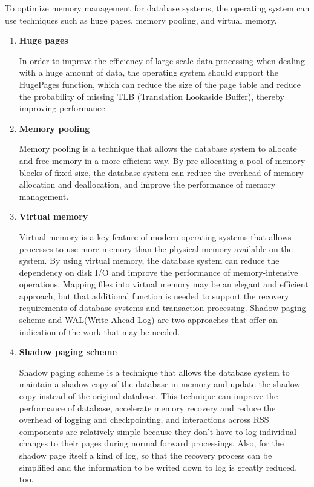\documentclass[11pt,a4paper]{article}
\begin{document}
To optimize memory management for database systems, the operating system can use techniques such as huge pages, memory pooling, and virtual memory.
\begin{enumerate}
    \item \textbf{Huge pages}
    
        In order to improve the efficiency of large-scale data processing when dealing with a huge amount of data, the operating system should support the HugePages function, 
    which can reduce the size of the page table and reduce the probability of missing TLB (Translation Lookaside Buffer), thereby improving performance.

    \item \textbf{Memory pooling}
    
        Memory pooling is a technique that allows the database system to allocate and free memory in a more efficient way.
    By pre-allocating a pool of memory blocks of fixed size, the database system can reduce the overhead of memory allocation and deallocation,
    and improve the performance of memory management.
    
    \item \textbf{Virtual memory}
    
        Virtual memory is a key feature of modern operating systems that allows processes to use more memory than the physical memory available on the system.
    By using virtual memory, the database system can reduce the dependency on disk I/O and improve the performance of memory-intensive operations.
    Mapping files into virtual memory may be an elegant and efficient approach, but that additional function is needed to support the recovery requirements of database systems and transaction processing.
    Shadow paging scheme and WAL(Write Ahead Log) are two approaches that offer an indication of the work that may be needed. 

    \item \textbf{Shadow paging scheme}
    
        Shadow paging scheme is a technique that allows the database system to maintain a shadow copy of the database in memory and update the shadow copy instead of the original database.
    This technique can improve the performance of database, accelerate memory recovery and reduce the overhead of logging and checkpointing, and interactions across RSS components are relatively simple 
    because they don't have to log individual changes to their pages during normal forward processings.\cite{10.1145/850726.850729} 
    Also, for the shadow page itself a kind of log, so that the recovery process can be simplified and the information to be writed down to log is greatly reduced, too.


\end{enumerate}
\end{document}
